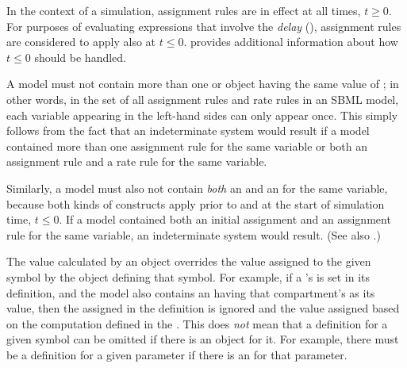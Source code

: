 
In the context of a simulation, assignment rules are in effect at
all times, $t \geq 0$.  For purposes of evaluating expressions
that involve the \emph{delay} 
(), assignment rules are considered
to apply also at $t \leq 0$.   provides
additional information about how $t \leq 0$ should be
  handled.

A model must not contain more than one \AssignmentRule or
\RateRule object having the same value of ; in
other words, in the set of all assignment rules and rate rules in
an SBML model, each variable appearing in the left-hand sides can
only appear once.  This simply follows from the fact that an
indeterminate system would result if a model contained more than
one assignment rule for the same variable or both an assignment
rule and a rate rule for the same variable.

Similarly, a model must also not contain \emph{both} an
\AssignmentRule and an \InitialAssignment for the same variable,
because both kinds of constructs apply prior to and at the start
of simulation time, \ie $t \leq 0$.  If a model contained both an
initial assignment and an assignment rule for the same variable,
an indeterminate system would result.  (See also
.)

The value calculated by an \AssignmentRule object overrides the
value assigned to the given symbol by the object defining that
symbol.  For example, if a \Compartment's  is set in
its definition, and the model also contains an \AssignmentRule
having that compartment's  as its 
value, then the  assigned in the \Compartment
definition is ignored and the value assigned based on the
computation defined in the \AssignmentRule.  This does \emph{not}
mean that a definition for a given symbol can be omitted if there
is an \AssignmentRule object for it.  For example, there must be a
\Parameter definition for a given parameter if there is an
\AssignmentRule for that parameter.


